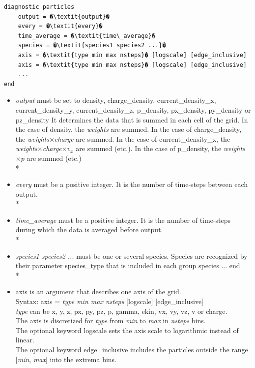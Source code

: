\documentclass[11pt]{article}
\newcommand{\code}[1]{\colorbox{yellow!15}{\ttfamily #1}}
\newcommand{\val}[1]{{\ttfamily \textit{#1}}}
\begin{document}
\begin{lstlisting}
diagnostic particles
	output = �\textit{output}�
	every = �\textit{every}�
	time_average = �\textit{time\_average}�
	species = �\textit{species1 species2 ...}�
	axis = �\textit{type min max nsteps}� [logscale] [edge_inclusive]
	axis = �\textit{type min max nsteps}� [logscale] [edge_inclusive]
	...
end
\end{lstlisting}

\begin{itemize}
\item \val{output} must be set to \code{density}, \code{charge\_density}, \code{current\_density\_x}, \code{current\_density\_y},
	\code{current\_density\_z}, \code{p\_density}, \code{px\_density}, \code{py\_density} or \code{pz\_density}
	It determines the data that is summed in each cell of the grid.
	In the case of \code{density}, the \textit{weights} are summed.
	In the case of \code{charge\_density}, the \textit{weights}$\times$\textit{charge} are summed.
	In the case of \code{current\_density\_x}, the \textit{weights}$\times$\textit{charge}$\times v_x$ are summed (etc.).
	In the case of \code{p\_density}, the \textit{weights}$\times p$ are summed (etc.)\\*
\item \val{every} must be a positive integer. It is the number of time-steps between each output.\\*
\item \val{time\_average} must be a positive integer. It is the number of time-steps during which the data is averaged before output.\\*
\item \val{species1 species2 ...}  must be one or several species.
	Species are recognized by their parameter \code{species\_type} that is included
	in each group \code{species ... end}\\*
\item \code{axis} is an argument that describes one axis of the grid.\\
	Syntax: \code{axis = \textit{type min max nsteps} [logscale] [edge\_inclusive]}\\
	\val{type} can be \code{x}, \code{y}, \code{z}, \code{px}, \code{py}, \code{pz}, \code{p}, 
	 \code{gamma}, \code{ekin}, \code{vx}, \code{vy}, \code{vz}, \code{v} or \code{charge}.\\
	The axis is discretized for \val{type} from \val{min} to \val{max} in \val{nsteps} bins.\\
	The optional keyword \code{logscale} sets the axis scale to logarithmic instead of linear.\\
	The optional keyword \code{edge\_inclusive} includes the particles outside the range [\val{min},  \val{max}]
	into the extrema bins.\\ \\
\end{itemize}
\end{document}

